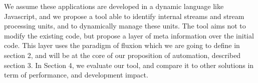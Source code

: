 We assume these applications are developed in a dynamic language like Javascript, and we propose a tool able to identify internal streams and stream processing units, and to dynamically manage these units.
The tool aims not to modify the existing code, but propose a layer of meta information over the initial code.
This layer uses the paradigm of fluxion which we are going to define in section 2, and will be at the core of our proposition of automation, described section 3.
In Section 4, we evaluate our tool, and compare it to other solutions in term of performance, and development impact.





